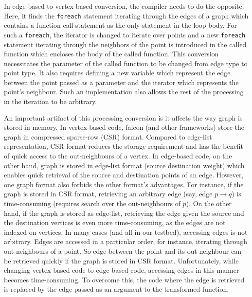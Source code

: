 \documentclass[12pt]{article}
\begin{document}
In edge-based to vertex-based conversion, the compiler needs to do the opposite. 
Here, it finds the \texttt{foreach} statement iterating through the edges of a graph which contains a function call statement as the only statement in the loop-body. 
For such a \texttt{foreach}, the iterator is changed to iterate over points and a new \texttt{foreach} statement iterating through the neighbors of the point is introduced in the called function which encloses the body of the called function. 
This conversion necessitates the parameter of the called function to be changed from edge type to point type. 
It also requires defining a new variable which represent the edge between the point passed as a parameter and the iterator which represents the point's neighbour. 
Such an implementation also allows the rest of the processing in the iteration to be arbitrary.

An important artifact of this processing conversion is it affects the way graph is stored in memory.
In vertex-based code, falcon (and other frameworks) store the graph in compressed sparse-row (CSR) format. 
Compared to edge-list representation, CSR format reduces the storage requirement and has the benefit of quick access to the out-neighbours of a vertex. 
In edge-based code, on the other hand, graph is stored in edge-list format (source destination weight) which enables quick retrieval of the source and destination points of an edge.
However, one graph format also forbids the other format's advantages.
For instance, if the graph is stored in CSR format, retrieving an arbitrary edge (say, edge $p \rightarrow q$) is time-consuming (requires search over the out-neighbours of $p$).
On the other hand, if the graph is stored as edge-list, retrieving the edge given the source and the destination vertices is even more time-consuming, as the edges are not indexed on vertices. 
In many cases (and all in our testbed), accessing edges is not arbitrary. 
Edges are accessed in a particular order, for instance, iterating through out-neighbours of a point. 
So edge between the point and its out-neighbour can be retrieved quickly if the graph is stored in CSR format. 
Unfortunately, while changing vertex-based code to edge-based code, accessing edges in this manner becomes time-consuming. 
To overcome this, the code where the edge is retrieved is replaced by the edge passed as an argument to the transformed function. 
\end{document}
